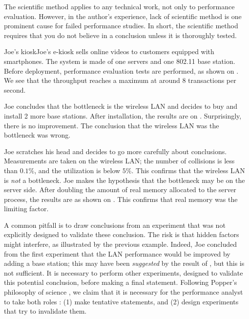 The scientific method applies to any technical
work, not only to performance evaluation.
However, in the author's experience, lack of
scientific method is one prominent cause for
failed performance studies. In short, the
scientific method requires that you do not
believe in a conclusion unless it is thoroughly
tested.

\begin{ex}{Joe's kiosk}Joe's e-kiosk sells online videos to customers
equipped with smartphones. The system is made of
one servers and one 802.11 base station.
 Before deployment, performance evaluation tests are performed, as shown on
 . We see that the throughput
 reaches a maximum at around 8 transactions per
 second.

Joe concludes that the bottleneck is the wireless
LAN and decides to buy and install 2 more base
stations. After installation, the results are on
. Surprisingly, there is no
improvement. The conclusion that the wireless LAN
was the bottleneck was wrong.

Joe scratches his head and decides to go more
carefully about conclusions. Measurements are
taken on the wireless LAN; the number of
collisions is less than $0.1\%$, and the
utilization is below $5\%$. This confirms that
the wireless LAN is \emph{not} a bottleneck. Joe
makes the hypothesis that the bottleneck may be
on the server side. After doubling the amount of
real memory allocated to the server process, the
results are as shown on . This
confirms that real memory was the limiting
factor. \label{ex-joe}
 \end{ex}
 \begin{figure}[htbp]
 \begin{center}
 \end{center}
  \label{metho-f1f2f3}
 \end{figure}

A common pitfall is to draw conclusions from an
experiment that
 was not explicitly designed to validate these conclusion. The risk
 is that hidden factors might interfere, as illustrated by the previous example.
 Indeed, Joe concluded from the first experiment that
 the LAN performance would be improved by adding a base station;
 this may have been \emph{suggested} by the result of
 , but this is not sufficient. It is necessary to
 perform other experiments, designed to validate this potential conclusion, before
 making a final statement. Following Popper's philosophy of science \cite{popper1935lfe}, we claim
 that it is necessary for the performance analyst to take both roles :
(1) make tentative statements, and (2) design
experiments that try to invalidate them.

